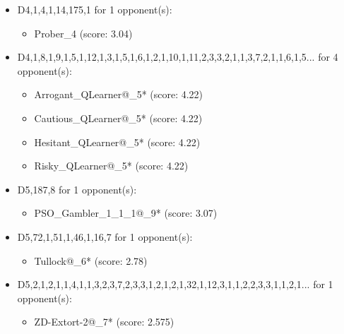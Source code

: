\begin{appendices}
\begin{itemize}
    \item D4,1,4,1,14,175,1 for 1 opponent(s):
    \begin{multicols}{3}
         \begin{itemize}
            \item Prober\_4 (score: 3.04)
        \end{itemize}
     \end{multicols}
     
    \item D4,1,8,1,9,1,5,1,12,1,3,1,5,1,6,1,2,1,10,1,11,2,3,3,2,1,1,3,7,2,1,1,6,1,5... for 4 opponent(s):
    \begin{multicols}{3}
         \begin{itemize}
            \item Arrogant\_QLearner@\_5* (score: 4.22)
            \item Cautious\_QLearner@\_5* (score: 4.22)
            \item Hesitant\_QLearner@\_5* (score: 4.22)
            \item Risky\_QLearner@\_5* (score: 4.22)
        \end{itemize}
     \end{multicols}
     
    \item D5,187,8 for 1 opponent(s):
    \begin{multicols}{3}
         \begin{itemize}
            \item PSO\_Gambler\_1\_1\_1@\_9* (score: 3.07)
        \end{itemize}
     \end{multicols}
     
    \item D5,72,1,51,1,46,1,16,7 for 1 opponent(s):
    \begin{multicols}{3}
         \begin{itemize}
            \item Tullock@\_6* (score: 2.78)
        \end{itemize}
     \end{multicols}
     
    \item D5,2,1,2,1,1,4,1,1,3,2,3,7,2,3,3,1,2,1,2,1,32,1,12,3,1,1,2,2,3,3,1,1,2,1... for 1 opponent(s):
    \begin{multicols}{3}
         \begin{itemize}
            \item ZD-Extort-2@\_7* (score: 2.575)
        \end{itemize}
     \end{multicols}
     

\end{itemize}
\end{appendices}
